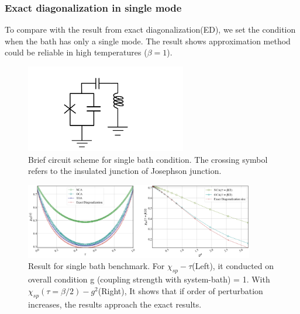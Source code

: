 \documentclass{article}[12pt]
\begin{document}
\begin{spacing}{1.5}
\subsubsection*{Exact diagonalization in single mode}
To compare with the result from exact diagonalization(ED), we set the condition when the bath has only a single mode. 
The result shows approximation method could be reliable in high temperatures ($\beta = 1$).
\begin{figure}[htbp]
  \centerline{\includegraphics[width=7cm]{TexFigure/kps_singlebath.png}}
  \caption{Brief circuit scheme for single bath condition. The crossing symbol  refers to the insulated junction of Josephson junction.}
\end{figure}
\begin{figure}[htbp]
  \centerline{\includegraphics[width=10cm]{TexFigure/bench_single_two.png}}
  \caption{Result for single bath benchmark. For $\chi_{sp} - \tau$(Left), it conducted on overall condition g (coupling strength with system-bath) = 1.
  With $\chi_{sp}(\tau=\beta/2)-g^2$(Right), It shows that if order of perturbation increases, the results approach the exact results.}
\end{figure}

\end{spacing}
\end{document}
